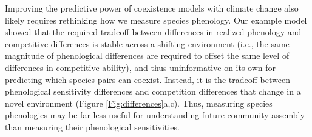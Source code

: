 \documentclass{article}[12pt]
\begin{document}
Improving the predictive power of coexistence models with climate change also likely requires rethinking how we measure species phenology. Our example model showed that the required tradeoff between differences in realized phenology and competitive differences is stable across a shifting environment (i.e., the same magnitude of phenological differences are required to offset the same level of differences in competitive ability), and thus uninformative on its own for predicting which species pairs can coexist. Instead, it is the tradeoff between phenological sensitivity differences and competition differences that change in a novel environment (Figure \ref{Fig:differences}a,c). Thus, measuring species phenologies may be far less useful for understanding future community assembly than measuring their phenological sensitivities.



\end{document}
